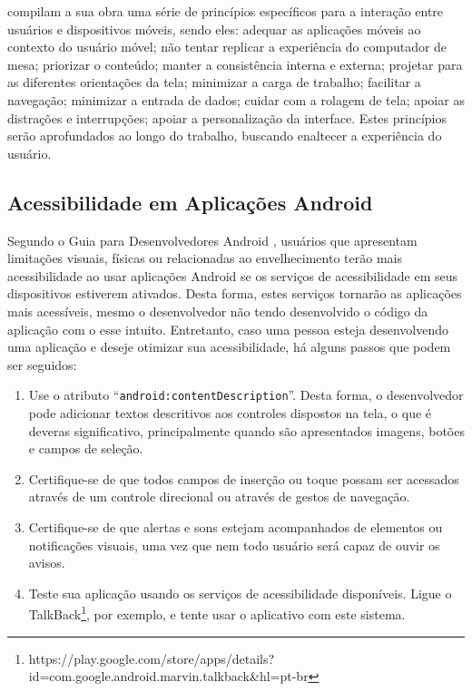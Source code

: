 \cite{ERGO2015} compilam a sua obra uma série de princípios específicos para a interação entre usuários e dispositivos móveis, sendo eles: adequar as aplicações móveis ao contexto do usuário móvel; não tentar replicar a experiência do computador de mesa; priorizar o conteúdo; manter a consistência interna e externa; projetar para as diferentes orientações da tela; minimizar a carga de trabalho; facilitar a navegação; minimizar a entrada de dados; cuidar com a rolagem de tela; apoiar as distrações e interrupções; apoiar a personalização da interface. Estes princípios serão aprofundados ao longo do trabalho, buscando enaltecer a experiência do usuário.


\subsection{Acessibilidade em Aplicações Android}

Segundo o Guia para Desenvolvedores Android \cite{DEVACCESS2016}, usuários que apresentam limitações visuais, físicas ou relacionadas ao envelhecimento terão mais acessibilidade ao usar aplicações Android se os serviços de acessibilidade em seus dispositivos estiverem ativados. Desta forma, estes serviços tornarão as aplicações mais acessíveis, mesmo o desenvolvedor não tendo desenvolvido o código da aplicação com o esse intuito. Entretanto, caso uma pessoa esteja desenvolvendo uma aplicação e deseje otimizar sua acessibilidade, há alguns passos que podem ser seguidos:
\begin{enumerate}
	\item Use o atributo “\texttt{android:contentDescription}”. Desta forma, o desenvolvedor pode adicionar textos descritivos aos controles dispostos na tela, o que é deveras significativo, principalmente quando são apresentados imagens, botões e campos de seleção.
	\item Certifique-se de que todos campos de inserção ou toque possam ser acessados através de um controle direcional ou através de gestos de navegação.
	\item Certifique-se de que alertas e sons estejam acompanhados de elementos ou notificações visuais, uma vez que nem todo usuário será capaz de ouvir os avisos.
	\item Teste sua aplicação usando os serviços de acessibilidade disponíveis. Ligue o TalkBack\footnote{https://play.google.com/store/apps/details?id=com.google.android.marvin.talkback\&hl=pt-br}, por exemplo, e tente usar o aplicativo com este sistema.
\end{enumerate}


